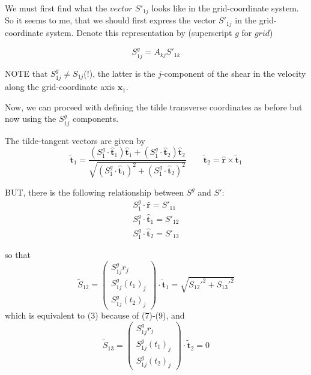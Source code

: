 \documentclass[12pt]{article}
\begin{document}
We must first find what the $vector$ $S'_{1j}$ looks like in the
grid-coordinate system. So it seems to me, that we should first
express the vector $S'_{1j}$ in the grid-coordinate system. Denote
this representation by (superscript $g$ for $grid$)

\begin{equation}S^g_{1j}  =  A_{kj} S'_{1k}\end{equation}

NOTE that $S^g_{1j} \neq S_{1j}$(!), the latter is the $j$-component
of the shear in the velocity along the grid-coordinate axis
$\bm{x}_1$.  

Now, we can proceed with defining the tilde transverse coordinates as before but now using the $S^g_{1j}$ components.
 
The tilde-tangent vectors are given by 
\begin{equation}
\bm{{\tilde t}}_1 = \frac{(S^g_{1}\cdot \hat{\bm{t}}_1) \bm{{\hat t}}_1 +  (S^g_{1}\cdot\hat{\bm{t}}_2) \bm{{\hat t}}_2 }
                         {\sqrt{ (S^g_{1}\cdot \hat{\bm{t}}_1)^2 +  (S^g_{1}\cdot\hat{\bm{t}}_2)^2 }}
\qquad
\bm{{\tilde t}}_2 = \bm{{\hat r}} \times \bm{{\tilde t}}_1
\end{equation}

BUT, there is the following relationship between $S^g$ and $S'$:
\begin{eqnarray}
S^g_{1}\cdot \hat{\bm {r}} = S'_{11}\\
S^g_{1}\cdot \hat{\bm {t}}_1 = S'_{12}\\
S^g_{1}\cdot \hat{\bm {t}}_2 = S'_{13}
\end{eqnarray}

so that
\begin{equation}
\tilde S_{12} = 
\begin{pmatrix}  S^g_{1j}r_j \\
                 S^g_{1j}(t_1)_j  \\
                 S^g_{1j}(t_2)_j 
\end{pmatrix}
\cdot \bm{{\tilde t}}_1 = 
 \sqrt{ S_{12}'^2 + S_{13}'^2 } 
\end{equation}
which is equivalent to (3) because of (7)-(9), and 
\begin{equation}
\tilde S_{13} = 
\begin{pmatrix}  S^g_{1j}r_j \\
                 S^g_{1j}(t_1)_j  \\
                 S^g_{1j}(t_2)_j 
\end{pmatrix}
\cdot \bm{{\tilde t}}_2 =  0
\end{equation}
\end{document}
